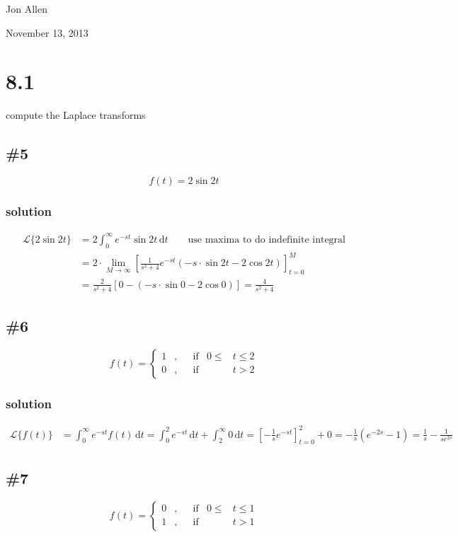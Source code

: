 \documentclass{article}
\begin{document}
Jon Allen

November 13, 2013

\section*{8.1}
compute the Laplace transforms
\subsection*{\#5}
\[f(t)=2\sin 2t\]

\subsubsection*{solution}
\begin{align*}
	\mathcal{L}\{2\sin 2t\}&
	=2\int_0^\infty{e^{-st}\sin 2t\,\mathrm{d}t} \qquad \text{use maxima to do indefinite integral}\\
	&=2\cdot\lim_{M\to \infty}\left[\frac{1}{s^2+4}e^{-st}(-s\cdot\sin 2t - 2 \cos 2t)\right]_{t=0}^M\\
	&=\frac{2}{s^2+4}\left[0-(-s\cdot\sin 0-2\cos 0)\right]=\frac{4}{s^2+4}
\end{align*}

\subsection*{\#6}
\[
	f(t)=\left\{
	\begin{aligned}
		1&, & &\text{if} & 0\leq&t\leq2\\
		0&, & &\text{if} & &t>2
	\end{aligned}
	\right.
\]

\subsubsection*{solution}
\begin{align*}
	\mathcal{L}\{f(t)\}&
	=\int_0^\infty{e^{-st}f(t)\,\mathrm{d}t}
	=\int_0^2{e^{-st}\,\mathrm{d}t}+\int_2^\infty{0\,\mathrm{d}t}
	=\left[-\frac{1}{s}e^{-st}\right]_{t=0}^2+0
	=-\frac{1}{s}(e^{-2s}-1)
	=\frac{1}{s}-\frac{1}{se^{2s}}
\end{align*}

\subsection*{\#7}
\[
	f(t)=\left\{
	\begin{aligned}
		0&, & &\text{if} & 0\leq&t\leq 1\\
		1&, & &\text{if} & &t>1
	\end{aligned}
	\right.
\]
\end{document}
